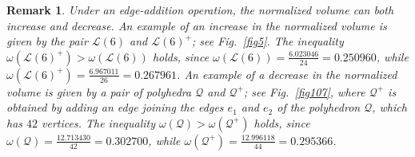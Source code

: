 \documentclass{amsart}
\newtheorem{remark}{Remark}[section]
\begin{document}
\begin{remark} \label{remark3.1}
{\rm 
Under an edge-addition operation, the normalized volume can both increase and decrease. An example of an increase in the normalized volume is given by the pair $\mathcal L(6)$ and $\mathcal L(6)^+$; see Fig.~\ref{fig5}. The inequality $\omega(\mathcal L(6)^+) > \omega(\mathcal L(6))$ holds, since $\omega(\mathcal L(6)) = \frac{6.023046}{24} = 0.250960$, while $\omega(\mathcal L(6)^+) = \frac{6.967011}{26} = 0.267961$. An example of a decrease in the normalized volume is given by a pair of polyhedra $\mathcal Q$ and $\mathcal Q^+$; see Fig.~\ref{fig107}, where $\mathcal Q^+$ is obtained by adding an edge joining the edges $e_1$ and $e_2$ of the polyhedron $\mathcal Q$, which has $42$ vertices. The inequality $\omega(\mathcal Q) > \omega(\mathcal Q^+)$ holds, since $\omega(\mathcal Q) = \frac{12.713430}{42} = 0.302700$, while $\omega(\mathcal Q^+) = \frac{12.996118}{44} = 0.295366$.
} 
\end{remark}
\end{document}
